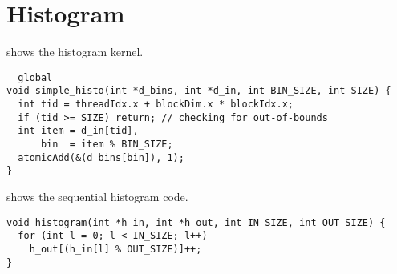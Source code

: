 \section{Histogram}
\label{sec:histogram}

 shows the histogram kernel.

\begin{lstlisting}[caption={Simple parallel histogram implementation}, label={lst:histo par}]
__global__ 
void simple_histo(int *d_bins, int *d_in, int BIN_SIZE, int SIZE) {
  int tid = threadIdx.x + blockDim.x * blockIdx.x;
  if (tid >= SIZE) return; // checking for out-of-bounds
  int item = d_in[tid], 
      bin  = item % BIN_SIZE;
  atomicAdd(&(d_bins[bin]), 1);
}
\end{lstlisting}

 shows the sequential histogram code.

\begin{lstlisting}[caption={Sequential histogram}, label={lst:hist seq}]
void histogram(int *h_in, int *h_out, int IN_SIZE, int OUT_SIZE) {
  for (int l = 0; l < IN_SIZE; l++) 
    h_out[(h_in[l] % OUT_SIZE)]++;
}
\end{lstlisting}
